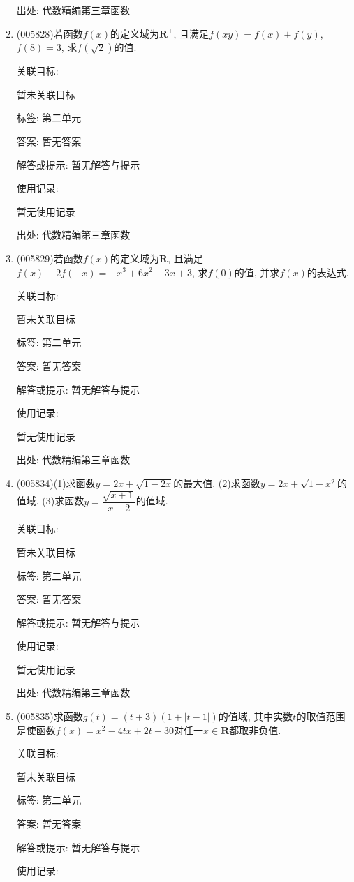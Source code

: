 \documentclass[10pt,a4paper]{article}
\begin{document}
\begin{enumerate}[1.]
出处: 代数精编第三章函数
\item { (005828)}若函数$f(x)$的定义域为$\mathbf{R}^+$, 且满足$f(xy)=f(x)+f(y)$, $f(8)=3$, 求$f(\sqrt 2)$的值.


关联目标:

暂未关联目标



标签: 第二单元

答案: 暂无答案

解答或提示: 暂无解答与提示

使用记录:

暂无使用记录


出处: 代数精编第三章函数
\item { (005829)}若函数$f(x)$的定义域为$\mathbf{R}$, 且满足$f(x)+2f(-x)=-x^3+6x^2-3x+3$, 求$f(0)$的值, 并求$f(x)$的表达式.


关联目标:

暂未关联目标



标签: 第二单元

答案: 暂无答案

解答或提示: 暂无解答与提示

使用记录:

暂无使用记录


出处: 代数精编第三章函数
\item { (005834)}(1)求函数$y=2x+\sqrt {1-2x}$的最大值.
(2)求函数$y=2x+\sqrt {1-x^2}$的值域.
(3)求函数$y=\dfrac{\sqrt {x+1}}{x+2}$的值域.


关联目标:

暂未关联目标



标签: 第二单元

答案: 暂无答案

解答或提示: 暂无解答与提示

使用记录:

暂无使用记录


出处: 代数精编第三章函数
\item { (005835)}求函数$g(t)=(t+3)(1+|t-1|)$的值域, 其中实数$t$的取值范围是使函数$f(x)=x^2-4tx+2t+30$对任一$x\in \mathbf{R}$都取非负值.


关联目标:

暂未关联目标



标签: 第二单元

答案: 暂无答案

解答或提示: 暂无解答与提示

使用记录:


\end{enumerate}
\end{document}

